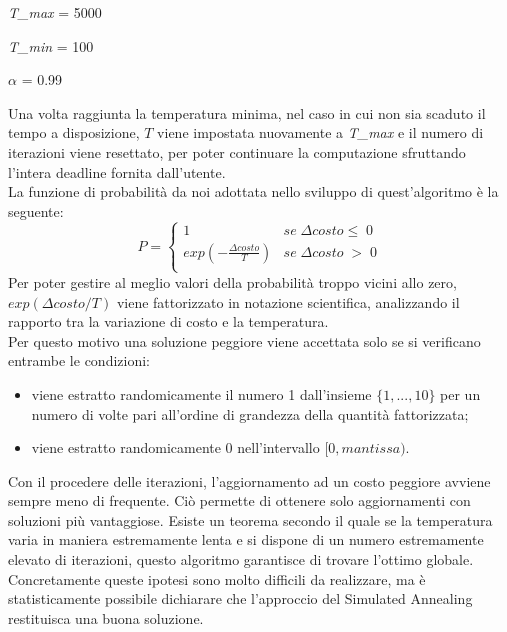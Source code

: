 \begin{itemize}
\begin{multicols}{3}
\item{\textit{T\_max} = 5000}
\item{\textit{T\_min} = 100}
\item{\textit{$\alpha$} = 0.99}
\end{multicols}
\end{itemize}
Una volta raggiunta la temperatura minima, nel caso in cui non sia scaduto il tempo a disposizione, $T$ viene impostata nuovamente a \textit{T\_max} e il numero di iterazioni viene resettato, per poter continuare la computazione sfruttando l'intera deadline fornita dall'utente.\\ 
La funzione di probabilità da noi adottata nello sviluppo di quest'algoritmo è la seguente\cite{SA}:
$$P = 
\begin{cases}
1 & se\; \Delta costo \leq \;0\\
exp(- \frac{\Delta costo}{T}) & se\; \Delta costo \;>\;0\\
\end{cases}
$$ 
Per poter gestire al meglio valori della probabilità troppo vicini allo zero, $exp(\Delta costo/T)$ viene fattorizzato in notazione scientifica, analizzando il rapporto tra la variazione di costo e la temperatura.\\Per questo motivo una soluzione peggiore viene accettata solo se si verificano entrambe le condizioni:
\begin{itemize}
\item{viene estratto randomicamente il numero 1 dall'insieme $\{1,...,10\}$ per un numero di volte pari all'ordine di grandezza della quantità fattorizzata;}
\item{viene estratto randomicamente 0 nell'intervallo $[0, mantissa)$.}
\end{itemize} 
Con il procedere delle iterazioni, l'aggiornamento ad un costo peggiore avviene sempre meno di frequente. Ciò permette di ottenere solo aggiornamenti con soluzioni più vantaggiose. Esiste un teorema secondo il quale se la temperatura varia in maniera estremamente lenta e si dispone di un numero estremamente elevato di iterazioni, questo algoritmo garantisce di trovare l'ottimo globale. Concretamente queste ipotesi sono molto difficili da realizzare, ma è statisticamente possibile dichiarare che l'approccio del Simulated Annealing restituisca una buona soluzione.\\\\
